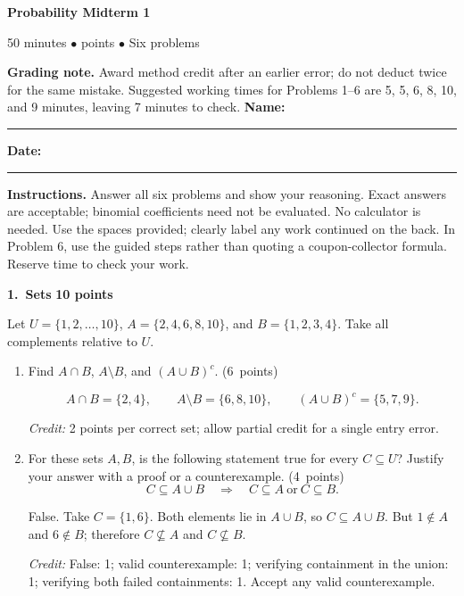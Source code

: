 \documentclass[11pt,letterpaper]{article}
\newcommand{\partpts}[1]{\unskip\nobreak\hspace{.3em}%
  \mbox{\small\color{muted}(#1 points)}}
\newcommand{\credit}[1]{\par{\footnotesize\color{muted}\textit{Credit:} #1}}
\newcommand{\problem}[3]{\par\addvspace{9pt}%
  {\large\bfseries\color{indigo}#1.\ #2}\hfill
  {\small\color{muted}\textbf{#3 points}}\par\nobreak}
\begin{document}
{\LARGE\bfseries\color{indigo}Probability Midterm 1}\par
{\small\color{muted}50 minutes \quad $\bullet$  points
  \quad $\bullet$ \quad Six problems}\par
\ifanswers
\textbf{Grading note.} Award method credit after an earlier error; do not
deduct twice for the same mistake. Suggested working times for Problems
1--6 are 5, 5, 6, 8, 10, and 9 minutes, leaving 7 minutes to check.
\else
\smallskip
\textbf{Name:}\ \rule{.49\linewidth}{.4pt}\hfill
\textbf{Date:}\ \rule{.20\linewidth}{.4pt}\par
\fi
\textbf{Instructions.} Answer all six problems and show your reasoning.
Exact answers are acceptable; binomial coefficients need not be evaluated.
No calculator is needed. Use the spaces provided; clearly label any work
continued on the back. In Problem 6, use the guided steps rather than
quoting a coupon-collector formula. Reserve time to check your work.

\problem{1}{Sets}{10}
Let $U=\{1,2,\ldots,10\}$, $A=\{2,4,6,8,10\}$, and
$B=\{1,2,3,4\}$. Take all complements relative to $U$.
\begin{enumerate}
\item Find $A\cap B$, $A\setminus B$, and $(A\cup B)^c$.
\partpts{6}
\begin{solution}[.85in]
\[
A\cap B=\{2,4\},\qquad A\setminus B=\{6,8,10\},\qquad
(A\cup B)^c=\{5,7,9\}.
\]
\credit{2 points per correct set; allow partial credit for a single entry error.}
\end{solution}
\item For these sets $A,B$, is the following statement true for every
$C\subseteq U$? Justify your answer with a proof or a counterexample.
\partpts{4}
\[
C\subseteq A\cup B\quad\Longrightarrow\quad
C\subseteq A\ \text{or}\ C\subseteq B.
\]
\begin{solution}[.85in]
False. Take $C=\{1,6\}$. Both elements lie in $A\cup B$, so
$C\subseteq A\cup B$. But $1\notin A$ and $6\notin B$;
therefore $C\nsubseteq A$ and $C\nsubseteq B$.
\credit{False: 1; valid counterexample: 1; verifying containment in the union: 1;
verifying both failed containments: 1. Accept any valid counterexample.}
\end{solution}
\end{enumerate}
\end{document}
